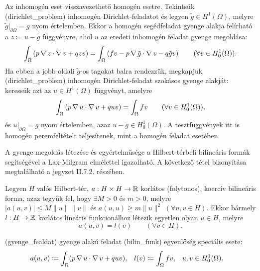 \begin{remark}\label{inhomogen}
	Az inhomogén eset visszavezethető homogén esetre. Tekintsük \aref({dirichlet_problem}) inhomogén Dirichlet-feladatot és legyen $\tilde{g} \in H^1(\Omega)$, melyre $\tilde{g}|_{\partial\Omega} = g$ nyom értelemben. Ekkor a homogén segédfeladat gyenge alakja felírható a $z \coloneqq u-\tilde{g}$ függvényre, ahol $u$ az eredeti inhomogén feladat gyenge megoldása:
	\begin{equation*}
		\int_{\Omega} \left( p \operatorname{\nabla} z  \cdot  \operatorname{\nabla} v + q z v \right) = \int_{\Omega} \left( f v - p \operatorname{\nabla} \tilde{g}  \cdot  \operatorname{\nabla} v - q \tilde{g} v \right) \qquad (\forall v \in H^1_0(\Omega)).
	\end{equation*}
	Ha ebben a jobb oldali $\tilde{g}$-os tagokat balra rendezzük, megkapjuk \aref({dirichlet_problem}) inhomogén Dirichlet-feladat szokásos gyenge alakját: keressük azt az $u \in H^1(\Omega)$ függvényt, amelyre
	\begin{equation*}
		\int_{\Omega} \left( p \operatorname{\nabla} u \cdot \operatorname{\nabla} v + q u v \right) = \int_{\Omega} f v  \qquad (\forall v \in H^1_0(\Omega)), 
	\end{equation*} 
	és $u|_{\partial\Omega}=g$ nyom értelemben, azaz $u-\tilde{g} \in H^1_0(\Omega)$. A tesztfüggvények itt is homogén peremfeltételt teljesítenek, mint a homogén feladat esetében.
\end{remark}



A gyenge megoldás létezése és egyértelműsége a Hilbert-térbeli bilineáris formák segítségével a Lax-Milgram elmélettel igazolható. A következő tétel  bizonyítása megtalálható a \cite{numfunk} jegyzet II.7.2. részében.

\begin{theorem}\label{lax-milgram}
	Legyen $H$ valós Hilbert-tér, $a: H \times H \rightarrow \mathbb{R}$ korlátos (folytonos), koercív bilineáris forma, azaz tegyük fel, hogy $\exists M > 0$ és $m > 0$, melyre $|a(u,v)| \leq M \|u\|\|v\|$ és $a(u,u) \geq m \|u\|^2$ $(\forall u, v \in H)$. Ekkor bármely $l : H \rightarrow \mathbb{R}$ korlátos lineáris funkcionálhoz létezik egyetlen olyan $u \in H$, melyre
	\begin{equation}\label{bilin_funk}
		a(u,v) = l(v) \qquad (\forall v \in H).
	\end{equation}
\end{theorem}



\Aref({gyenge_fealdat}) gyenge alakú feladat \aref({bilin_funk}) egyenlőség speciális esete:
\begin{align}\label{variacio_funk}
		a(u,v) &\coloneqq \int_{\Omega} (p \operatorname{\nabla} u \cdot \operatorname{\nabla} v + q u v)  ,&  l(v) &\coloneqq \int_{\Omega} f v,&  & u, v \in H^1_0(\Omega).		
\end{align}


